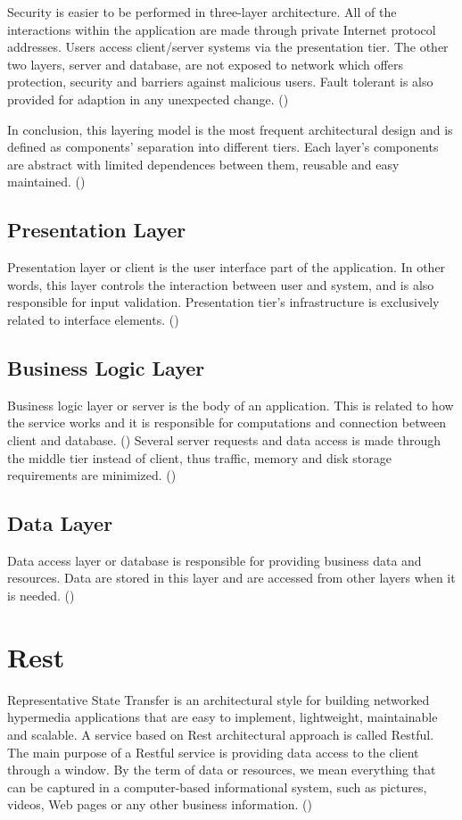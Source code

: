 Security is easier to be performed in three-layer architecture. All of the interactions within the application are made through private Internet protocol addresses. Users access client/server systems via the presentation tier. The other two layers, server and database, are not exposed to network which offers protection, security and barriers against malicious users. Fault tolerant is also provided for adaption in any unexpected change. (\cite{Reference2})\par

In conclusion, this layering model is the most frequent architectural design and is defined as components' separation into different tiers. Each layer's components are abstract with limited dependences between them, reusable and easy maintained. (\cite{Reference2}) \par

\subsection{Presentation Layer}
Presentation layer or client is the user interface part of the application. In other words, this layer controls the interaction between user and system, and is also responsible for input validation. Presentation tier's infrastructure is exclusively related to interface elements. (\cite{Reference2})\par

\subsection{Business Logic Layer}
Business logic layer or server is the body of an application. This is related to how the service works and it is responsible for computations and connection between client and database. (\cite{Reference2}) Several server requests and data access is made through the middle tier instead of client, thus traffic, memory and disk storage requirements are minimized. (\cite{Reference5})\par

\subsection{Data Layer}
Data access layer or database is responsible for providing business data and resources. Data are stored in this layer and are accessed from other layers when it is needed. (\cite{Reference2})\par


\section{Rest}
Representative State Transfer is an architectural style for building networked hypermedia applications that are easy to implement, lightweight, maintainable and scalable. A service based on Rest architectural approach is called Restful. The main purpose of a Restful service is providing data access to the client through a window. By the term of data or resources, we mean everything that can be captured in a computer-based informational system, such as pictures, videos, Web pages or any other business information. (\cite{Reference7}) \par

